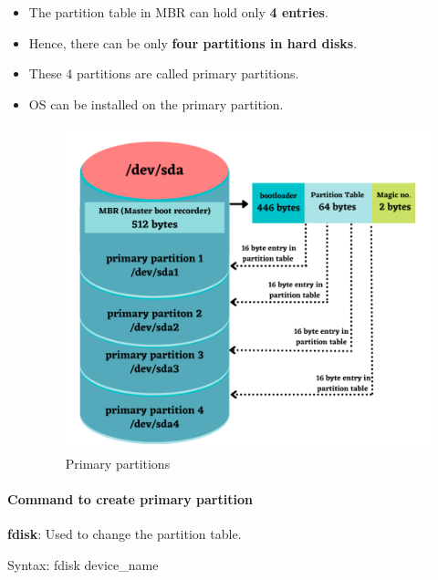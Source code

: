 \setlength{\columnsep}{3pt}
\begin{flushleft}
	
	\begin{itemize}
		\item The partition table in MBR can hold only \textbf{4 entries}.
		\item Hence, there can be only \textbf{four partitions in hard disks}.
		\item These 4 partitions are called primary partitions.
		\item OS can be installed on the primary partition.
		\begin{figure}[h!]
			\centering
			\includegraphics[scale=.6]{content/chapter8/images/correct.png}
			\caption{Primary partitions}
			\label{primary_naming}
		\end{figure}		
		
	\end{itemize}

\newpage

\paragraph{Command to create primary partition}

\bigskip
\textbf{fdisk}: Used to change the partition table.
	\bigskip
	\begin{tcolorbox}[breakable,notitle,boxrule=-0pt,colback=pink,colframe=pink]
		\color{black}
		\font=9pt
		Syntax: fdisk device\_name
		\font=4pt
	\end{tcolorbox}


\end{flushleft}
